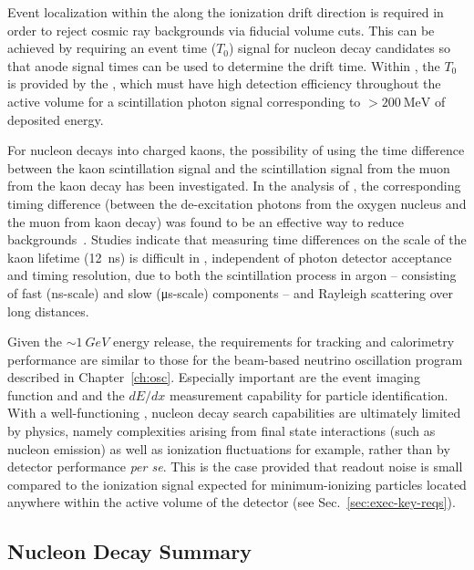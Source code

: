Event localization within the  along the ionization 
drift direction is required in order to reject cosmic ray 
backgrounds via fiducial volume cuts. This can be achieved by 
requiring an event time ($T_0$) signal for nucleon decay 
candidates so that  anode signal times can be used to 
determine the drift time.  Within , the $T_0$ is provided by 
the , which must have high detection 
efficiency throughout the  active volume for a 
scintillation photon signal corresponding to 
$>\SI{200}{\MeV}$ of deposited energy.

For nucleon decays into charged kaons, the possibility of using 
the time difference between the kaon scintillation signal and 
the scintillation signal from the muon from the kaon decay has 
been investigated.  
In the \superk analysis of \ptoknubar, the 
corresponding timing difference (between the de-excitation 
photons from the oxygen nucleus and the muon from kaon decay) 
was found to be an effective way to reduce
backgrounds~\cite{Abe:2014mwa}.  
Studies indicate that measuring time differences on the scale 
of the kaon lifetime (\SI{12}{\ns}) is difficult in , 
independent of photon detector acceptance and timing resolution, 
due to both the scintillation process in argon 
-- consisting of fast (\si{\ns}-scale) and slow (\si{\micro\second}-scale) components --  and 
Rayleigh scattering over long distances.

Given the $\sim \SI{1}{GeV}$ energy release, 
the requirements for tracking 
and calorimetry performance are similar to those for the 
beam-based neutrino oscillation program described 
in Chapter~\ref{ch:osc}.  Especially important are the 
event imaging function and and the $dE/dx$ measurement 
capability for particle identification.   
With a well-functioning , nucleon decay search  
capabilities are ultimately limited by physics, namely
complexities arising from 
final state interactions (such as nucleon emission) 
as well as ionization fluctuations for example, 
rather than by detector performance {\sl per se}. This is 
the case provided that readout noise is small compared to 
the ionization signal expected for minimum-ionizing particles
located anywhere within the active volume of the detector 
(see Sec.~\ref{sec:exec-key-reqs}).


\subsection{Nucleon Decay Summary}
\label{sec:ndksummary}

